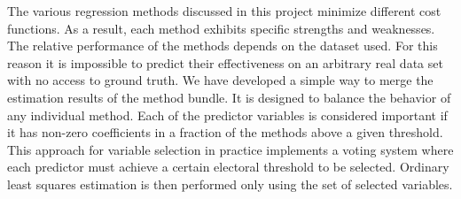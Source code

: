 The various regression methods discussed in this project minimize different cost functions. As a result, each method exhibits specific strengths and weaknesses. The relative performance of the methods depends on the dataset used. For this reason it is impossible to predict their effectiveness on an arbitrary real data set with no access to ground truth. We have developed a simple way to merge the estimation results of the method bundle. It is designed to balance the behavior of any individual method. Each of the predictor variables is considered important if it has non-zero coefficients in a fraction of the methods above a given threshold. This approach for variable selection in practice implements a voting system where each predictor must achieve a certain electoral threshold to be selected. Ordinary least squares estimation is then performed only using the set of selected variables.

